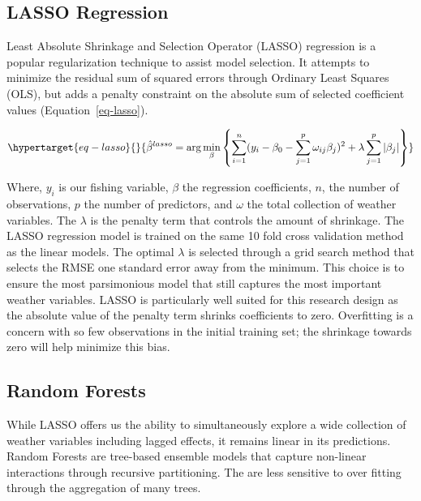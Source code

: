 \documentclass[
  letterpaper,
  DIV=11,
  numbers=noendperiod]{scrartcl}
\begin{document}
\hypertarget{lasso-regression}{%
\subsection{LASSO Regression}\label{lasso-regression}}

Least Absolute Shrinkage and Selection Operator (LASSO) regression is a
popular regularization technique to assist model selection. It attempts
to minimize the residual sum of squared errors through Ordinary Least
Squares (OLS), but adds a penalty constraint on the absolute sum of
selected coefficient values (Equation~\ref{eq-lasso}).

\begin{equation}\protect\hypertarget{eq-lasso}{}{
\hat{\beta}^{lasso}=\arg\min_{\beta}\left\{\sum_{i=1}^{n}(y_i-\beta_0-\sum_{j=1}^{p}\omega_{ij}\beta_j)^2+\lambda\sum_{j=1}^{p}|\beta_j|\right\}
}\label{eq-lasso}\end{equation}

Where, \(y_i\) is our fishing variable, \(\beta\) the regression
coefficients, \(n\), the number of observations, \(p\) the number of
predictors, and \(\omega\) the total collection of weather variables.
The \(\lambda\) is the penalty term that controls the amount of
shrinkage. The LASSO regression model is trained on the same 10 fold
cross validation method as the linear models. The optimal \(\lambda\) is
selected through a grid search method that selects the RMSE one standard
error away from the minimum. This choice is to ensure the most
parsimonious model that still captures the most important weather
variables. LASSO is particularly well suited for this research design as
the absolute value of the penalty term shrinks coefficients to zero.
Overfitting is a concern with so few observations in the initial
training set; the shrinkage towards zero will help minimize this bias.

\hypertarget{random-forests}{%
\subsection{Random Forests}\label{random-forests}}

While LASSO offers us the ability to simultaneously explore a wide
collection of weather variables including lagged effects, it remains
linear in its predictions. Random Forests are tree-based ensemble models
that capture non-linear interactions through recursive partitioning. The
are less sensitive to over fitting through the aggregation of many
trees.
\end{document}
